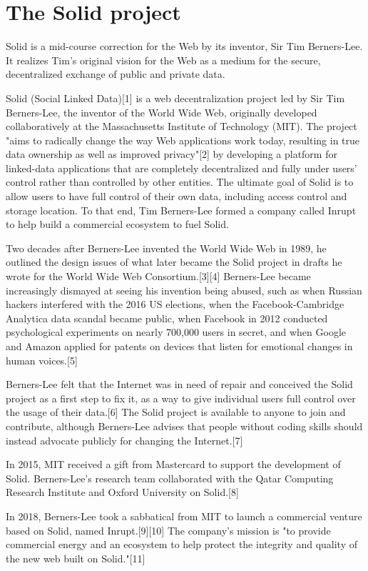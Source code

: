 \section{The Solid project}
Solid is a mid-course correction for the Web by its inventor, Sir Tim Berners-Lee. It realizes Tim's original vision for the Web as a medium for the secure, decentralized exchange of public and private data.

Solid (Social Linked Data)[1] is a web decentralization project led by Sir Tim Berners-Lee, the inventor of the World Wide Web, originally developed collaboratively at the Massachusetts Institute of Technology (MIT). The project "aims to radically change the way Web applications work today, resulting in true data ownership as well as improved privacy"[2] by developing a platform for linked-data applications that are completely decentralized and fully under users' control rather than controlled by other entities. The ultimate goal of Solid is to allow users to have full control of their own data, including access control and storage location. To that end, Tim Berners-Lee formed a company called Inrupt to help build a commercial ecosystem to fuel Solid.

Two decades after Berners-Lee invented the World Wide Web in 1989, he outlined the design issues of what later became the Solid project in drafts he wrote for the World Wide Web Consortium.[3][4] Berners-Lee became increasingly dismayed at seeing his invention being abused, such as when Russian hackers interfered with the 2016 US elections, when the Facebook-Cambridge Analytica data scandal became public, when Facebook in 2012 conducted psychological experiments on nearly 700,000 users in secret, and when Google and Amazon applied for patents on devices that listen for emotional changes in human voices.[5]

Berners-Lee felt that the Internet was in need of repair and conceived the Solid project as a first step to fix it, as a way to give individual users full control over the usage of their data.[6] The Solid project is available to anyone to join and contribute, although Berners-Lee advises that people without coding skills should instead advocate publicly for changing the Internet.[7]

In 2015, MIT received a gift from Mastercard to support the development of Solid. Berners-Lee's research team collaborated with the Qatar Computing Research Institute and Oxford University on Solid.[8]

In 2018, Berners-Lee took a sabbatical from MIT to launch a commercial venture based on Solid, named Inrupt.[9][10] The company's mission is "to provide commercial energy and an ecosystem to help protect the integrity and quality of the new web built on Solid."[11]


